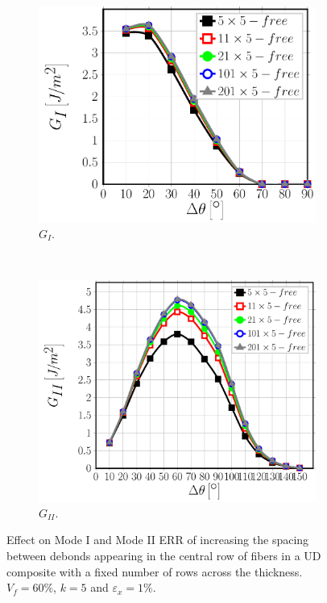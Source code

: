 \begin{figure}[!h]
\centering
    \begin{subfigure}[b]{0.45\textwidth}
        \includegraphics[width=\textwidth]{paperB/sideabovefibers-t5-vf60-GI.pdf}
        \caption{$G_{I}$.}\label{paperB:subfig:sideabovefiber60MIt5}
    \end{subfigure} ~
    \begin{subfigure}[b]{0.45\textwidth}
        \includegraphics[width=\textwidth]{paperB/sideabovefibers-t5-vf60-GII.pdf}
        \caption{$G_{II}$.}\label{paperB:subfig:sideabovefiber60MIIt5}
    \end{subfigure}

\caption{Effect on Mode I and Mode II ERR of increasing the spacing between debonds appearing in the central row of fibers in a UD composite with a fixed number of rows across the thickness.  $V_{f}=60\%$, $k=5$ and $\varepsilon_{x}=1\%$.}\label{paperB:fig:sideabovefibersthickfixed}
\end{figure}

